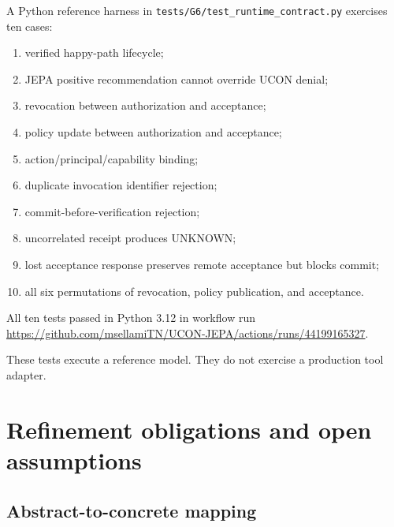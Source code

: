 \documentclass[11pt,a4paper]{article}
\theoremstyle{remark}
\begin{document}
A Python reference harness in \texttt{tests/G6/test\_runtime\_contract.py} exercises ten cases:
\begin{enumerate}[leftmargin=2em]
\item verified happy-path lifecycle;
\item JEPA positive recommendation cannot override UCON denial;
\item revocation between authorization and acceptance;
\item policy update between authorization and acceptance;
\item action/principal/capability binding;
\item duplicate invocation identifier rejection;
\item commit-before-verification rejection;
\item uncorrelated receipt produces UNKNOWN;
\item lost acceptance response preserves remote acceptance but blocks commit;
\item all six permutations of revocation, policy publication, and acceptance.
\end{enumerate}
All ten tests passed in Python 3.12 in workflow run \url{https://github.com/msellamiTN/UCON-JEPA/actions/runs/44199165327}.

These tests execute a reference model. They do not exercise a production tool adapter.

\section{Refinement obligations and open assumptions}

\subsection{Abstract-to-concrete mapping}
\end{document}
